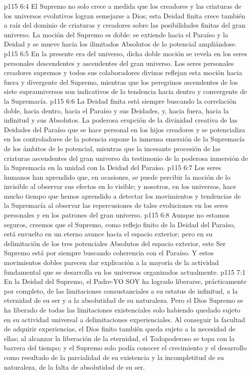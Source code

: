 \vs p115 6:4 \pc El Supremo no solo crece a medida que los creadores y las criaturas de los universos evolutivos logran semejarse a Dios; esta Deidad finita crece también a raíz del dominio de criaturas y creadores sobre las posibilidades finitas del gran universo. La moción del Supremo es doble: se extiende hacia el Paraíso y la Deidad y se mueve hacia los ilimitados Absolutos de lo potencial ampliándose.
\vs p115 6:5 En la presente era del universo, dicha doble moción se revela en los seres personales descendentes y ascendentes del gran universo. Los seres personales creadores supremos y todos sus colaboradores divinos reflejan esta moción hacia fuera y divergente del Supremo, mientras que los peregrinos ascendentes de los siete suprauniversos son indicativos de la tendencia hacia dentro y convergente de la Supremacía.
\vs p115 6:6 La Deidad finita está siempre buscando la correlación doble, hacia dentro, hacia el Paraíso y sus Deidades, y, hacia fuera, hacia la infinitud y sus Absolutos. La poderosa erupción de la divinidad creativa de las Deidades del Paraíso que se hace personal en los hijos creadores y se potencializa en los controladores de la potencia supone la inmensa emersión de la Supremacía de los ámbitos de lo potencial, mientras que la incesante procesión de las criaturas ascendentes del gran universo da testimonio de la poderosa inmersión de la Supremacía en la unidad con la Deidad del Paraíso.
\vs p115 6:7 Los seres humanos han aprendido que, en ocasiones, se puede percibir la moción de lo invisible al observar sus efectos en lo visible; y nosotros, en los universos, hace mucho tiempo que hemos aprendido a detectar los movimientos y tendencias de la Supremacía al observar las repercusiones de tales evoluciones en los seres personales y en los patrones del gran universo.
\vs p115 6:8 Aunque no estamos seguros, creemos que el Supremo, como reflejo finito de la Deidad del Paraíso, está envuelto en un eterno avance hacia el espacio exterior; pero en su delimitación de los tres potenciales Absolutos del espacio exterior, este Ser Supremo está por siempre buscando coherencia con el Paraíso. Y estos movimientos dobles parecen dar explicación a la mayoría de la actividad fundamental que se desarrolla en los universos organizados actualmente.
\vs p115 7:1 En la Deidad del Supremo, el Padre\hyp{}YO SOY ha logrado liberarse, prácticamente por completo, de las limitaciones consustanciales a su estatus de infinitud, a la eternidad de su ser y a la absolutidad de su naturaleza. Pero el Dios Supremo se ha liberado de todas las limitaciones existenciales solo habiendo quedado sujeto en su actividad universal a delimitaciones experienciales. Al conseguir la facultad de adquirir experiencias, el Dios finito también queda sujeto a la necesidad de ellas; al alcanzar la liberación de la eternidad, el Todopoderoso se topa con la barrera del tiempo; y el Supremo solo podía conocer el crecimiento y el desarrollo como resultado de la parcialidad de su existencia y la incompletitud de su naturaleza, de la falta de absolutidad de su ser.
